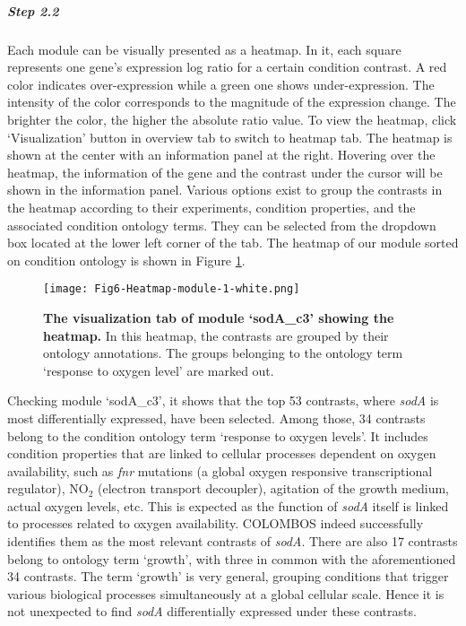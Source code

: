 \begin{small}
\subparagraph{Step 2.2}	Each module can be visually presented as a heatmap. 
In it, each square represents one gene's expression log ratio for a certain
condition contrast. A red color indicates over-expression while a green one
shows under-expression. The intensity of the color corresponds to the
magnitude of the expression change. The brighter the color, the higher the
absolute ratio value.
%
To view the heatmap, click `Visualization' button in overview tab to switch to
heatmap tab.  The heatmap is shown at the center with an information panel at
the right. Hovering over the heatmap, the information of the gene and the
contrast under the cursor will be shown in the information panel. Various
options exist to group the contrasts in the heatmap according to their
experiments, condition properties, and the associated condition ontology
terms. They can be selected from the dropdown box located at the lower left
corner of the tab. The heatmap of our module sorted on condition ontology is
shown in Figure \ref{fig:colombos-heatmap-m1}.
%
\begin{figure}[tb]
	\centering
  	\texttt{[image: Fig6-Heatmap-module-1-white.png]}
	\caption[Heatmap of module `sodA\_c3']{\textbf{The visualization tab of 
	module `sodA\_c3' showing the heatmap.}
	In this heatmap, the contrasts are grouped by their ontology annotations. 
	The groups belonging to the ontology term `response to oxygen 
	level' are marked out.}
	\label{fig:colombos-heatmap-m1}
\end{figure}

\end{small} %

Checking module `sodA\_c3', it shows that the top 53 contrasts, where
\textit{sodA} is most differentially expressed, have been selected. Among
those, 34 contrasts belong to the condition ontology term `response to oxygen
levels'.  It includes condition properties that are linked to cellular
processes dependent on oxygen availability, such as \textit{fnr} mutations (a
global oxygen responsive transcriptional regulator), NO$_2$ (electron
transport decoupler), agitation of the growth medium, actual oxygen levels,
etc. This is expected as the function of \textit{sodA} itself is linked to 
processes related to oxygen availability.
COLOMBOS indeed successfully identifies them as the most relevant contrasts of
\textit{sodA}. 
%
There are also 17 contrasts belong to ontology term `growth', with three in
common with the aforementioned 34 contrasts. The term `growth' is very
general, grouping conditions that trigger various biological processes
simultaneously at a global cellular scale. Hence it is not unexpected to find
\textit{sodA} differentially expressed under these contrasts.




